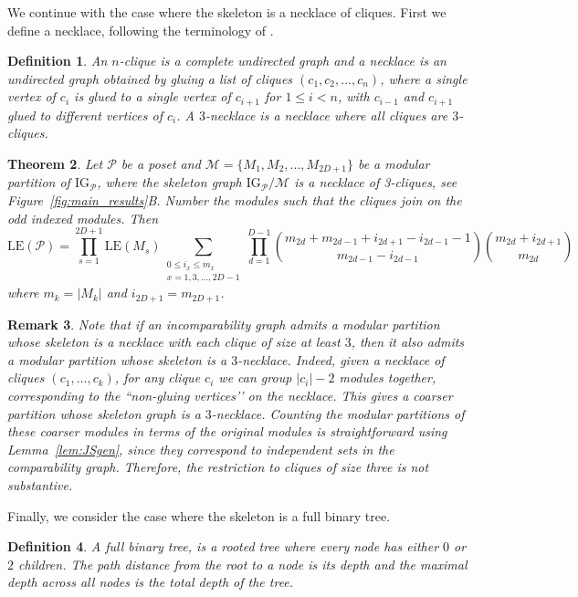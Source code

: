 \documentclass[9pt,a4paper,oneside]{article}
\newtheorem{theorem}{Theorem}
\newtheorem{remark}[theorem]{Remark}
\newtheorem{definition}[theorem]{Definition}
\newcommand{\cM}{\mathcal{M}}
\newcommand{\cP}{\mathcal{P}}
\newcommand{\IG}{\mathrm{IG}}
\newcommand{\lex}{\mathrm{LE}}
\begin{document}
We continue with the case where the skeleton is a necklace of cliques. 
First we define a necklace, following the terminology of \cite{belardo10}.
\begin{definition}
An  \emph{$n$-clique} is a complete undirected graph and a \emph{necklace} is an undirected graph obtained by gluing a list of cliques $(c_1, c_2, ..., c_n)$, where a single vertex of $c_i$ is glued to a single vertex of $c_{i+1}$ for $1\leq i < n$, with $c_{i-1}$ and $c_{i+1}$ glued to different vertices of $c_i$.  A \emph{$3$-necklace} is a necklace where all cliques are $3$-cliques.
\end{definition}

\begin{theorem}\label{thm:necklace}
Let $\cP$ be a poset and $\cM=\{M_1,M_2,\ldots,M_{2D+1}\}$ be a modular partition of $\IG_\cP$, where 
 the skeleton graph $\IG_\cP/\cM$ is a necklace of 3-cliques, see Figure~\ref{fig:main_results}B. Number the modules such that the cliques join on the odd indexed modules.
Then
\[\lex(\cP) = 
	\prod_{s=1}^{2D+1} \lex(M_s)
	\sum_{\substack{0\le i_x\le m_x\\x=1,3,\ldots, 2D-1}}
		\prod_{d=1}^{D-1} 
			\binom{m_{2d}+m_{2d-1}+i_{2d+1}-i_{2d-1}-1}{m_{2d-1}-i_{2d-1}}\binom{m_{2d}+i_{2d+1}}{m_{2d}} \]
where $m_k=|M_k|$ and $i_{2D+1}=m_{2D+1}$.
\end{theorem}

\begin{remark}
Note that if an incomparability graph admits a modular partition whose skeleton is a necklace with each clique of size at least $3$,
then it also admits a modular partition whose skeleton is a $3$-necklace. Indeed,  given a necklace of cliques $(c_1,\ldots,c_k)$, for any clique $c_i$ we can group $|c_i|-2$ modules together, corresponding to the  ``non-gluing vertices’’ on the necklace.  This gives a coarser partition whose skeleton graph is a $3$-necklace. 
Counting the modular partitions of these coarser modules in terms of the original modules is straightforward using Lemma~\ref{lem:JSgen}, since they correspond to independent sets in the comparability graph.
Therefore, the restriction to cliques of size three is not substantive. 
\end{remark}

Finally, we consider the case where the skeleton is a full binary tree. 

\begin{definition}
A \emph{full binary tree}, is a rooted tree where every node has either $0$ or $2$ children.  The path distance from the root to a node is its \emph{depth} and the maximal depth across all nodes is the \emph{total depth} of the tree.
\end{definition}
\end{document}
